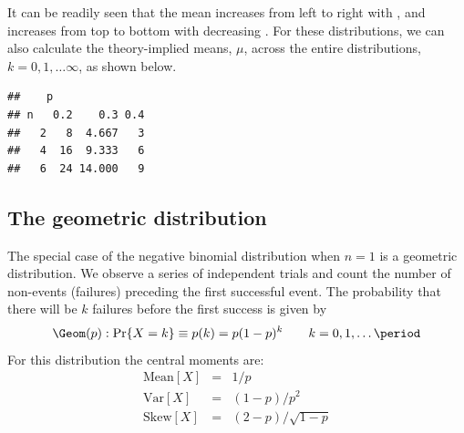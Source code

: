 \documentclass[11pt]{book}
\renewenvironment{knitrout}{\small\renewcommand{\baselinestretch}{.85}}{} %
\begin{document}
It can be readily seen that the mean increases from left to
right with , and increases from top to bottom with
decreasing .  For these distributions, we can also
calculate the theory-implied means, $\mu$, across the entire
distributions, $k = 0, 1, \dots \infty$, as shown below.

\begin{knitrout}
\color{fgcolor}\begin{kframe}
\begin{alltt}
 \hlkwb{<-} \hlstd{(}\hlstd{=}\hlstd{(}\hlstd{,} \hlstd{,} \hlstd{),} \hlstd{=}\hlstd{(}\hlstd{,} \hlstd{,} \hlstd{))}
 \hlkwb{<-}  \hlkwb{=} \hlopt{*}\hlstd{(}\hlopt{-}\hlopt{/}
\hlopt{$} \hlstd{,} \hlstd{,} \hlstd{=}\hlstd{(}\hlstd{=}\hlstd{(}\hlstd{,}\hlstd{,}\hlstd{),} \hlstd{=(}\hlopt{:}\hlstd{)}\hlopt{/}\hlstd{))}
\end{alltt}
\begin{verbatim}
##    p
## n   0.2    0.3 0.4
##   2   8  4.667   3
##   4  16  9.333   6
##   6  24 14.000   9
\end{verbatim}
\end{kframe}
\end{knitrout}




\subsection{The geometric distribution}\label{sec:geometric}
The special case of the negative binomial distribution when $n=1$
is a geometric distribution.
We observe a series of independent trials and count the number
of non-events (failures) preceding the first successful event.
The probability that there will be  $k$ failures before the first
success
is given by
\begin{equation}\label{eq:geomf}
\Geom(p):   \Pr \{ X = k \} \equiv p ( k )  =
   p (1-p)^k
  \quad\quad k = 0, 1, \dots
  \period
\end{equation}
For this distribution the central moments are:
\begin{eqnarray*}
\textrm{Mean}[X] & = & 1 / p\\
\textrm{Var}[X] &  = & (1-p) / p^2 \\
\textrm{Skew}[X] & = & (2-p) / \sqrt{1-p}
\end{eqnarray*}
\end{document}
